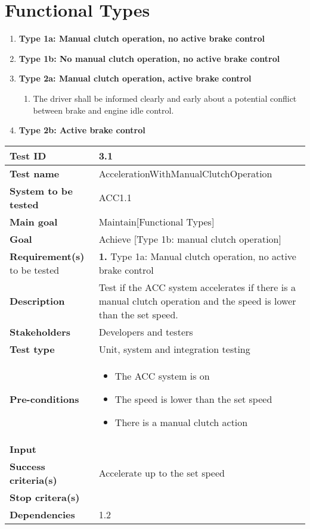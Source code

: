 \section{Functional Types}

	\begin{enumerate}
		\item {\bf Type 1a: Manual clutch operation, no active brake control}
		\item {\bf Type 1b: No manual clutch operation, no active brake control}
		\item {\bf Type 2a: Manual clutch operation, active brake control}
			\begin{enumerate}[label*=\arabic*.]
				\item The driver shall be informed clearly and early about a potential 
				conflict between brake and engine idle control. 
			\end{enumerate}
		\item {\bf Type 2b: Active brake control}
	\end{enumerate}

	\begin{table}[H]
		\begin{tabular}{| p{4cm} | p{10cm} |}
			\hline \rowcolor{gray}
			{\bf Test ID} & 3.1 \\ \hline
			{\bf Test name} & AccelerationWithManualClutchOperation \\ \hline
			{\bf System to be tested} & ACC1.1\\ \hline
			{\bf Main goal} & Maintain[Functional Types] \\ \hline
			{\bf Goal} & Achieve [Type 1b: manual clutch operation] \\ \hline
			{\bf Requirement(s)} to be tested & {\bf 1.} Type 1a: Manual clutch operation, no active brake control\\ \hline
			{\bf Description} & Test if the ACC system accelerates if there is a manual clutch 
			operation and the speed is lower than the set speed. \\ \hline
			{\bf Stakeholders} & Developers and testers \\ \hline
			{\bf Test type} &  Unit, system and integration testing \\ \hline
			{\bf Pre-conditions} & 
				\begin{itemize}
					\item The ACC system is on
					\item The speed is lower than the set speed
					\item There is a manual clutch action
				\end{itemize}\\ \hline
			{\bf Input} & \\ \hline
			{\bf Success criteria(s)} & Accelerate up to the set speed\\ \hline
			{\bf Stop critera(s)} &  \\ \hline
			{\bf Dependencies} & 1.2\\ \hline
		\end{tabular}
	\end{table}


